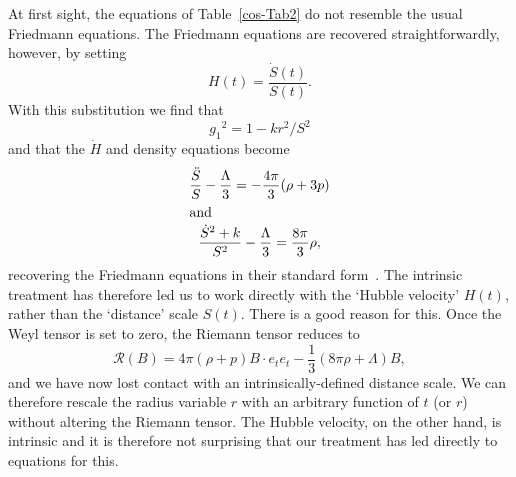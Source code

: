 \documentclass[a4paper]{article}
\numberwithin{equation}{section}
\newcommand{\dt}{\! \cdot \!}
\newcommand{\third}{{\textstyle \frac{1}{3}}}
\newcommand{\clr}{{\mathcal{R}}}
\newcommand{\Hdt}{\dot{H}}
\begin{document}
At first sight, the equations of Table~\ref{cos-Tab2} do not resemble
the usual Friedmann equations.  The Friedmann equations are recovered
straightforwardly, however, by setting
%
\begin{equation}
H(t) = \frac{\dot{S}(t)}{S(t)}.
\end{equation}
%
With this substitution we find that
%
\begin{equation}
{g_1}^2 = 1 - k r^2/ S^2
\end{equation}
%
and that the $\Hdt$ and density equations become
%
\begin{gather}
\frac{\ddot{S}}{S}-\frac{\Lambda}{3} = - \frac{4\pi}{3} (\rho +3p) \\
%
\intertext{and}
%
\frac{\dot{S}^2 +k}{S^2} - \frac{\Lambda}{3} = \frac{8\pi}{3} \rho, 
\end{gather}
%
recovering the Friedmann equations in their standard
form~\cite{nar-cosm}.  The intrinsic treatment has therefore led us to
work directly with the `Hubble velocity' $H(t)$, rather than the
`distance' scale $S(t)$.  There is a good reason for this.  Once the
Weyl tensor is set to zero, the Riemann tensor reduces to
%
\begin{equation}
\clr(B) = 4 \pi (\rho+p) B \dt e_t e_t - \third (8 \pi \rho +
\Lambda) B,
\end{equation}
%
and we have now lost contact with an intrinsically-defined distance
scale.  We can therefore rescale the radius variable $r$ with an
arbitrary function of $t$ (or $r$) without altering the Riemann
tensor.  The Hubble velocity, on the other hand, is intrinsic and it
is therefore not surprising that our treatment has led directly to
equations for this.
\end{document}
